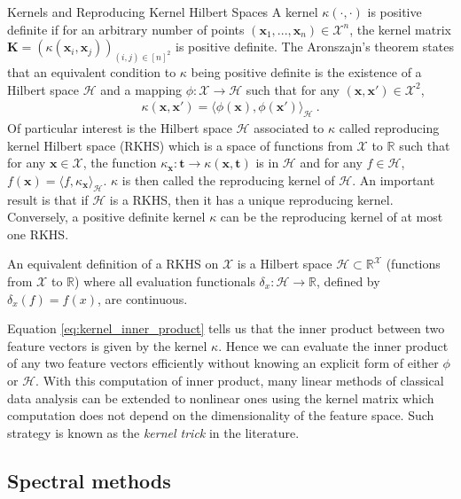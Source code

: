 \begin{rem2}{Kernels and Reproducing Kernel Hilbert Spaces}
	A kernel $\kappa(\cdot, \cdot)$ is positive definite if for an arbitrary number of points $(\bm{x}_1, ..., \bm{x}_n) \in \mathcal{X}^n$, the kernel matrix $\bm{K} = (\kappa(\bm{x}_i, \bm{x}_j))_{(i,j) \in [n]^2}$ is positive definite. The Aronszajn's theorem states that an equivalent condition to $\kappa$ being positive definite is the existence of a Hilbert space $\mathcal{H}$ and a mapping $\phi : \mathcal{X} \to \mathcal{H}$ such that for any $(\bm{x}, \bm{x'}) \in \mathcal{X}^2$,
\begin{align}\label{eq:kernel_inner_product}
    \kappa(\bm{x}, \bm{x'}) = \langle \phi(\bm{x}), \phi(\bm{x'}) \rangle_{\mathcal{H}} \:.
\end{align}
Of particular interest is the Hilbert space $\mathcal{H}$ associated to $\kappa$ called reproducing kernel Hilbert space (RKHS) which is a space of functions from $\mathcal{X}$ to $\mathbb{R}$ such that for any $\bm{x} \in \mathcal{X}$, the function $\kappa_{\bm{x}} : \bm{t} \to \kappa(\bm{x}, \bm{t})$ is in $\mathcal{H}$ and for any $f \in \mathcal{H}$, $f(\bm{x}) = \langle f, \kappa_{\bm{x}} \rangle_{\mathcal{H}}$. $\kappa$ is then called the reproducing kernel of $\mathcal{H}$. An important result is that if $\mathcal{H}$ is a RKHS, then it has a unique reproducing kernel. Conversely, a positive definite kernel $\kappa$ can be the reproducing kernel of at most one RKHS.


An equivalent definition of a RKHS on $\mathcal{X}$ is a Hilbert
space $\mathcal{H} \subset \mathbb{R}^{\mathcal{X}}$ (functions from $\mathcal{X}$ to $\mathbb{R}$) where all evaluation functionals $\delta_x : \mathcal{H} \to \mathbb{R}$,
defined by $\delta_x(f) = f(x)$, are continuous.

Equation \ref{eq:kernel_inner_product} tells us that the inner product between two feature vectors is given by the kernel $\kappa$. Hence we can evaluate the inner product of any two feature vectors efficiently without knowing an explicit form of either $\phi$ or $\mathcal{H}$. With this computation of inner product, many linear methods of classical data analysis can be extended to nonlinear ones using the kernel matrix which computation does not depend on the dimensionality of the feature space. Such strategy is known as the \textit{kernel trick} in the literature.
\end{rem2}



\subsection{Spectral methods}

